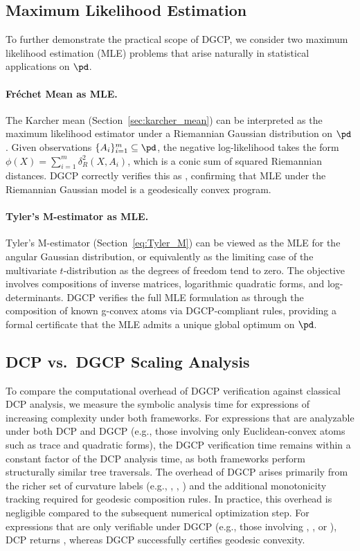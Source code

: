 \documentclass[twoside,11pt]{article}
\begin{document}
\subsection{Maximum Likelihood Estimation}

To further demonstrate the practical scope of DGCP, we consider two maximum likelihood estimation (MLE) problems that arise naturally in statistical applications on $\pd$.

\paragraph{Fr\'{e}chet Mean as MLE.}
The Karcher mean (Section~\ref{sec:karcher_mean}) can be interpreted as the maximum likelihood estimator under a Riemannian Gaussian distribution on $\pd$. Given observations $\{A_i\}_{i=1}^m \subseteq \pd$, the negative log-likelihood takes the form $\phi(X) = \sum_{i=1}^m \delta_R^2(X, A_i)$, which is a conic sum of squared Riemannian distances. DGCP correctly verifies this as , confirming that MLE under the Riemannian Gaussian model is a geodesically convex program.

\paragraph{Tyler's M-estimator as MLE.}
Tyler's M-estimator (Section~\ref{eq:Tyler_M}) can be viewed as the MLE for the angular Gaussian distribution, or equivalently as the limiting case of the multivariate $t$-distribution as the degrees of freedom tend to zero. The objective involves compositions of inverse matrices, logarithmic quadratic forms, and log-determinants. DGCP verifies the full MLE formulation as  through the composition of known g-convex atoms via DGCP-compliant rules, providing a formal certificate that the MLE admits a unique global optimum on $\pd$.

\subsection{DCP vs.\ DGCP Scaling Analysis}

To compare the computational overhead of DGCP verification against classical DCP analysis, we measure the symbolic analysis time for expressions of increasing complexity under both frameworks. For expressions that are analyzable under both DCP and DGCP (e.g., those involving only Euclidean-convex atoms such as trace and quadratic forms), the DGCP verification time remains within a constant factor of the DCP analysis time, as both frameworks perform structurally similar tree traversals. The overhead of DGCP arises primarily from the richer set of curvature labels (e.g., , , ) and the additional monotonicity tracking required for geodesic composition rules. In practice, this overhead is negligible compared to the subsequent numerical optimization step. For expressions that are only verifiable under DGCP (e.g., those involving , , or ), DCP returns , whereas DGCP successfully certifies geodesic convexity.
\end{document}
